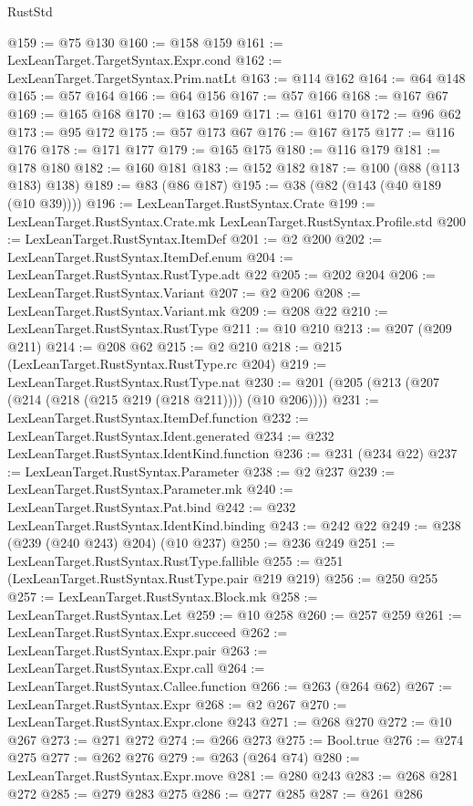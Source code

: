 \begin{lexlean}{RustStd}
\begin{coremodule}
@159 := @75 @130
@160 := @158 @159
@161 := LexLeanTarget.TargetSyntax.Expr.cond
@162 := LexLeanTarget.TargetSyntax.Prim.natLt
@163 := @114 @162
@164 := @64 @148
@165 := @57 @164
@166 := @64 @156
@167 := @57 @166
@168 := @167 @67
@169 := @165 @168
@170 := @163 @169
@171 := @161 @170
@172 := @96 @62
@173 := @95 @172
@175 := @57 @173 @67
@176 := @167 @175
@177 := @116 @176
@178 := @171 @177
@179 := @165 @175
@180 := @116 @179
@181 := @178 @180
@182 := @160 @181
@183 := @152 @182
@187 := @100 (@88 (@113 @183) @138)
@189 := @83 (@86 @187)
@195 := @38 (@82 (@143 (@40 @189 (@10 @39))))
@196 := LexLeanTarget.RustSyntax.Crate
@199 := LexLeanTarget.RustSyntax.Crate.mk LexLeanTarget.RustSyntax.Profile.std
@200 := LexLeanTarget.RustSyntax.ItemDef
@201 := @2 @200
@202 := LexLeanTarget.RustSyntax.ItemDef.enum
@204 := LexLeanTarget.RustSyntax.RustType.adt @22
@205 := @202 @204
@206 := LexLeanTarget.RustSyntax.Variant
@207 := @2 @206
@208 := LexLeanTarget.RustSyntax.Variant.mk
@209 := @208 @22
@210 := LexLeanTarget.RustSyntax.RustType
@211 := @10 @210
@213 := @207 (@209 @211)
@214 := @208 @62
@215 := @2 @210
@218 := @215 (LexLeanTarget.RustSyntax.RustType.rc @204)
@219 := LexLeanTarget.RustSyntax.RustType.nat
@230 := @201 (@205 (@213 (@207 (@214 (@218 (@215 @219 (@218 @211)))) (@10 @206))))
@231 := LexLeanTarget.RustSyntax.ItemDef.function
@232 := LexLeanTarget.RustSyntax.Ident.generated
@234 := @232 LexLeanTarget.RustSyntax.IdentKind.function
@236 := @231 (@234 @22)
@237 := LexLeanTarget.RustSyntax.Parameter
@238 := @2 @237
@239 := LexLeanTarget.RustSyntax.Parameter.mk
@240 := LexLeanTarget.RustSyntax.Pat.bind
@242 := @232 LexLeanTarget.RustSyntax.IdentKind.binding
@243 := @242 @22
@249 := @238 (@239 (@240 @243) @204) (@10 @237)
@250 := @236 @249
@251 := LexLeanTarget.RustSyntax.RustType.fallible
@255 := @251 (LexLeanTarget.RustSyntax.RustType.pair @219 @219)
@256 := @250 @255
@257 := LexLeanTarget.RustSyntax.Block.mk
@258 := LexLeanTarget.RustSyntax.Let
@259 := @10 @258
@260 := @257 @259
@261 := LexLeanTarget.RustSyntax.Expr.succeed
@262 := LexLeanTarget.RustSyntax.Expr.pair
@263 := LexLeanTarget.RustSyntax.Expr.call
@264 := LexLeanTarget.RustSyntax.Callee.function
@266 := @263 (@264 @62)
@267 := LexLeanTarget.RustSyntax.Expr
@268 := @2 @267
@270 := LexLeanTarget.RustSyntax.Expr.clone @243
@271 := @268 @270
@272 := @10 @267
@273 := @271 @272
@274 := @266 @273
@275 := Bool.true
@276 := @274 @275
@277 := @262 @276
@279 := @263 (@264 @74)
@280 := LexLeanTarget.RustSyntax.Expr.move
@281 := @280 @243
@283 := @268 @281 @272
@285 := @279 @283 @275
@286 := @277 @285
@287 := @261 @286

\end{coremodule}
\end{lexlean}
